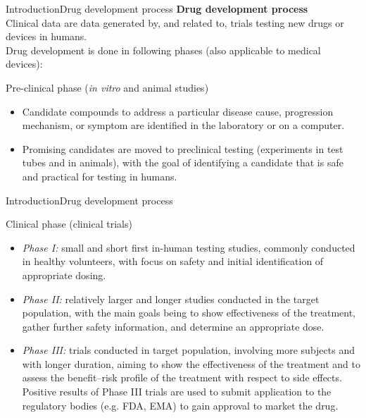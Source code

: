 \documentclass[xcolor=dvipsnames,11pt]{beamer}
\begin{document}
\begin{frame}[fragile]{Introduction}{Drug development process}
	\textbf{Drug development process}\\
	\bigskip
	Clinical data are data generated by, and related
	to, trials testing new drugs or devices in humans.\\
	\bigskip
	Drug development is done in following phases (also applicable to medical devices):
	\begin{block}{Pre-clinical phase (\textit{in vitro} and animal studies)}
		\begin{itemize}
			\item Candidate compounds to address a particular disease cause, progression mechanism,
			or symptom are identified in the laboratory or on a computer.
			\item Promising candidates are moved to preclinical testing (experiments in test tubes and in animals), with the goal of identifying a candidate that is safe and practical for testing in humans.
		\end{itemize}
	\end{block}
\end{frame}

\begin{frame}[fragile]{Introduction}{Drug development process}
	\begin{block}{Clinical phase (clinical trials)}
		\begin{itemize}
			\item \textcolor{PineGreen}{\textit{Phase I:}} small and short first in-human testing studies, commonly conducted in healthy volunteers, with focus on safety and initial identification of appropriate dosing.
			\item \textcolor{PineGreen}{\textit{Phase II:}} relatively larger and longer studies conducted in the target population, with the main goals being to show effectiveness of the treatment, gather further safety information, and determine an appropriate dose.
			\item \textcolor{PineGreen}{\textit{Phase III:}} trials conducted in target population, involving more subjects and with longer duration, aiming to show the effectiveness of the treatment and to assess the benefit–risk profile of the treatment with respect to side effects. Positive results of Phase III trials are used to submit application to the regulatory bodies (e.g. FDA, EMA) to gain approval to market the drug.
		\end{itemize}
	\end{block}
\end{frame}
\end{document}
